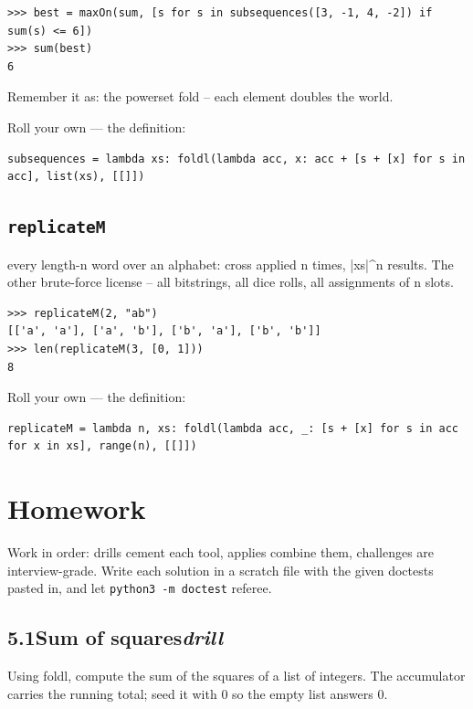 \documentclass[10pt,letterpaper]{book}
\begin{document}
\begin{lstlisting}[style=ex]
>>> best = maxOn(sum, [s for s in subsequences([3, -1, 4, -2]) if sum(s) <= 6])
>>> sum(best)
6
\end{lstlisting}

Remember it as: the powerset fold -- each element doubles the world.


Roll your own --- the definition:

\begin{lstlisting}[style=ex]
subsequences = lambda xs: foldl(lambda acc, x: acc + [s + [x] for s in acc], list(xs), [[]])
\end{lstlisting}

\subsection{\texttt{replicateM}}\label{def:replicateM}
every length-n word over an alphabet: cross applied n times, |xs|\^{}n results. The other brute-force license -- all bitstrings, all dice rolls, all assignments of n slots.
\begin{lstlisting}[style=ex]
>>> replicateM(2, "ab")
[['a', 'a'], ['a', 'b'], ['b', 'a'], ['b', 'b']]
>>> len(replicateM(3, [0, 1]))
8
\end{lstlisting}

Roll your own --- the definition:

\begin{lstlisting}[style=ex]
replicateM = lambda n, xs: foldl(lambda acc, _: [s + [x] for s in acc for x in xs], range(n), [[]])
\end{lstlisting}
\section{Homework}
Work in order: drills cement each tool, applies combine them,
challenges are interview-grade. Write each solution in a scratch file with
the given doctests pasted in, and let \texttt{python3 -m doctest} referee.
\subsection*{5.1\quad Sum of squares\hfill\textnormal{\textit{drill}}}
Using foldl, compute the sum of the squares of a list of integers. The accumulator carries the running total; seed it with 0 so the empty list answers 0.
\end{document}
